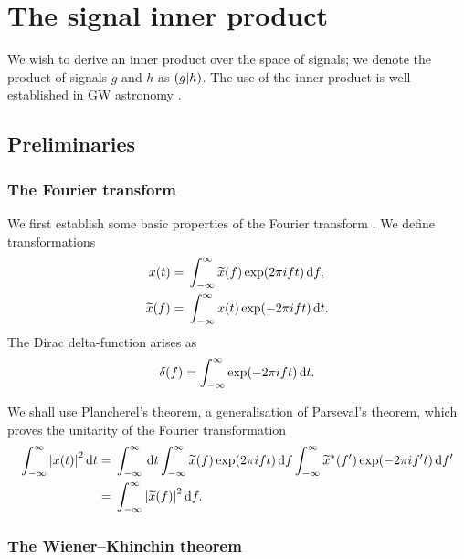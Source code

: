\chapter{The signal inner product}\label{ap:inner-prod}

We wish to derive an inner product over the space of signals; we denote the product of signals $g$ and $h$ as $\left({g}\middle|{h}\right)$. The use of the inner product is well established in GW astronomy \citep{Jaranowski2012}.

\section{Preliminaries}

\subsection{The Fourier transform}

We first establish some basic properties of the Fourier transform \citep[section 13.1]{Riley2002}. We define transformations
\begin{subequations}
\begin{align}
x(t) = {} & \int_{-\infty}^{\infty}{\widetilde{x}(f)\exp(2\pi ift)}\,\mathrm{d}{f}, \\
\widetilde{x}(f) = {} & \int_{-\infty}^{\infty}{x(t)\exp(-2\pi ift)}\,\mathrm{d}{t}.
\end{align}
\end{subequations}
The Dirac delta-function arises as
\begin{equation}
\delta(f) = \int_{-\infty}^{\infty}{\exp(-2\pi ift)}\,\mathrm{d}{t}.
\end{equation}

We shall use Plancherel's theorem, a generalisation of Parseval's theorem, which proves the unitarity of the Fourier transformation
\begin{align}
\int_{-\infty}^{\infty}{\left|x(t)\right|^2}\,\mathrm{d}{t} = {} & \int_{-\infty}^\infty\,\mathrm{d} t \int_{-\infty}^{\infty}{\widetilde{x}(f)\exp(2\pi ift)}\,\mathrm{d}{f} \int_{-\infty}^{\infty}{\widetilde{x}^\ast(f')\exp(-2\pi if't)}\,\mathrm{d}{f'} \nonumber \\
 = {} & \int_{-\infty}^{\infty}{\left|\widetilde{x}(f)\right|^2}\,\mathrm{d}{f}.
\end{align}

\subsection{The Wiener--Khinchin theorem}

